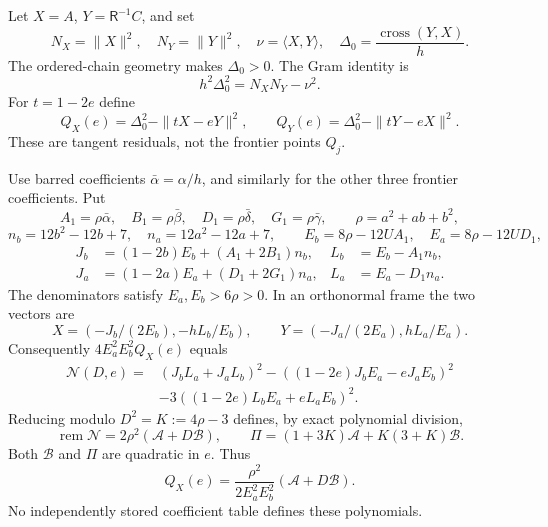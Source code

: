 Let $X=A$, $Y=\mathsf R^{-1}C$, and set
\[
 N_X=\|X\|^2,\quad N_Y=\|Y\|^2,\quad
 \nu=\langle X,Y\rangle,\quad
 \Delta_0=\frac{\operatorname{cross}(Y,X)}h.
\]
The ordered-chain geometry makes $\Delta_0>0$.  The Gram identity is
\begin{equation}
 h^2\Delta_0^2=N_XN_Y-\nu^2.
 \label{eq:certificate-Gram}
\end{equation}
For $t=1-2e$ define
\begin{equation}
 Q_X(e)=\Delta_0^2-\|tX-eY\|^2,\qquad
 Q_Y(e)=\Delta_0^2-\|tY-eX\|^2.
 \label{eq:certificate-Q}
\end{equation}
These are tangent residuals, not the frontier points $Q_j$.

Use barred coefficients $\bar\alpha=\alpha/h$, and similarly for the
other three frontier coefficients.  Put
\[
 A_1=\rho\bar\alpha,\quad B_1=\rho\bar\beta,\quad
 D_1=\rho\bar\delta,\quad G_1=\rho\bar\gamma,
 \qquad \rho=a^2+ab+b^2,
\]
\[
 n_b=12b^2-12b+7,\quad n_a=12a^2-12a+7,
 \qquad E_b=8\rho-12UA_1,\quad E_a=8\rho-12UD_1,
\]
\[
 \begin{aligned}
 J_b&=(1-2b)E_b+(A_1+2B_1)n_b,& L_b&=E_b-A_1n_b,\\
 J_a&=(1-2a)E_a+(D_1+2G_1)n_a,& L_a&=E_a-D_1n_a.
 \end{aligned}
\]
The denominators satisfy $E_a,E_b>6\rho>0$.
In an orthonormal frame the two vectors are
\[
 X=(-J_b/(2E_b),-hL_b/E_b),\qquad
 Y=(-J_a/(2E_a),hL_a/E_a).
\]
Consequently $4E_a^2E_b^2Q_X(e)$ equals
\[
 \begin{aligned}
 \mathcal N(D,e)={}&(J_bL_a+J_aL_b)^2
 -((1-2e)J_bE_a-eJ_aE_b)^2\\
 &-3((1-2e)L_bE_a+eL_aE_b)^2.
 \end{aligned}
\]
Reducing modulo $D^2=K:=4\rho-3$ defines, by exact polynomial division,
\begin{equation}
 \operatorname{rem}\mathcal N=2\rho^2(\mathcal A+D\mathcal B),\qquad
 \Pi=(1+3K)\mathcal A+K(3+K)\mathcal B.
 \label{eq:f-explicit-polynomials}
\end{equation}
Both $\mathcal B$ and $\Pi$ are quadratic in $e$.  Thus
\[
 Q_X(e)=\frac{\rho^2}{2E_a^2E_b^2}(\mathcal A+D\mathcal B).
\]
No independently stored coefficient table defines these polynomials.

